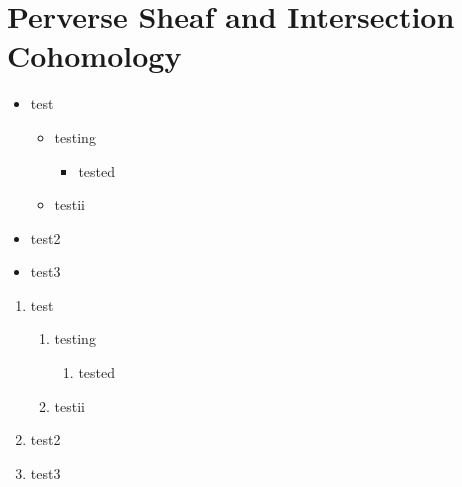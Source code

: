 \section{Perverse Sheaf and Intersection Cohomology}

\begin{itemize}
    \item test
    \begin{itemize}
        \item testing
        \begin{itemize}
            \item tested
        \end{itemize}
        \item testii
    \end{itemize}
    \item test2
    \item test3
\end{itemize}

\begin{enumerate}
    \item test
    \begin{enumerate}
        \item testing
        \begin{enumerate}
            \item tested
        \end{enumerate}
        \item testii
    \end{enumerate}
    \item test2
    \item test3
\end{enumerate}




